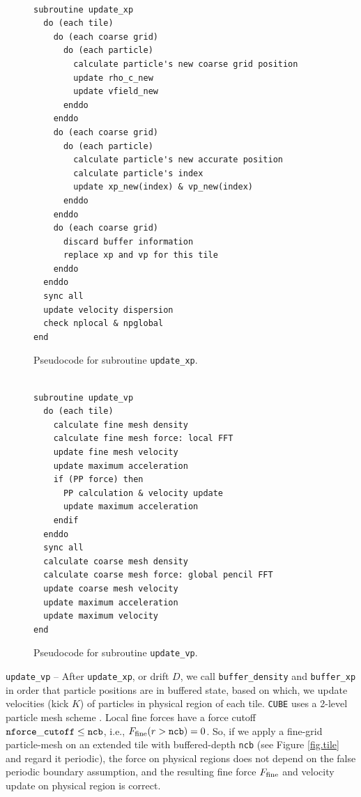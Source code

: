 \documentclass[10pt,twocolumn,preprint]{emulateapj}
\begin{document}
\begin{figure}[t]
\begin{verbatim}

subroutine update_xp
  do (each tile)
    do (each coarse grid)
      do (each particle)
        calculate particle's new coarse grid position
        update rho_c_new
        update vfield_new
      enddo
    enddo
    do (each coarse grid)
      do (each particle)
        calculate particle's new accurate position
        calculate particle's index
        update xp_new(index) & vp_new(index)
      enddo
    enddo
    do (each coarse grid)
      discard buffer information
      replace xp and vp for this tile
    enddo
  enddo
  sync all
  update velocity dispersion
  check nplocal & npglobal
end
\end{verbatim}
\caption{Pseudocode for subroutine {\tt update\_xp}.}
\label{fig.update_xp}
\end{figure}

\begin{figure}[t]
\begin{verbatim}

subroutine update_vp
  do (each tile)
    calculate fine mesh density
    calculate fine mesh force: local FFT
    update fine mesh velocity
    update maximum acceleration
    if (PP force) then
      PP calculation & velocity update
      update maximum acceleration
    endif
  enddo
  sync all
  calculate coarse mesh density
  calculate coarse mesh force: global pencil FFT
  update coarse mesh velocity
  update maximum acceleration
  update maximum velocity
end
\end{verbatim}
\caption{Pseudocode for subroutine {\tt update\_vp}.}
\label{fig.update_vp}
\end{figure}

{\tt update\_vp} -- 
After {\tt update\_xp}, or drift $D$, we call {\tt buffer\_density} and {\tt buffer\_xp} in order that particle positions are in buffered state, based on which, we update velocities (kick $K$) of particles in physical region of each tile. {\tt CUBE} uses a 2-level particle mesh scheme \citep{2013MNRAS.436..540H}. Local fine forces have a force cutoff ${\tt nforce\_cutoff}\leq{\tt ncb}$, i.e., $F_{\rm fine}(r>{\tt ncb})=0$. So, if we apply a fine-grid particle-mesh on an extended tile with buffered-depth {\tt ncb} (see Figure \ref{fig.tile} and regard it periodic), the force on physical regions does not depend on the false periodic boundary assumption, and the resulting fine force $F_{\rm fine}$ and velocity update on physical region is correct.
\end{document}
